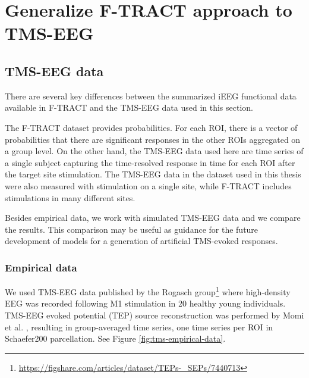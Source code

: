 \chapter{Generalize F-TRACT approach to TMS-EEG}\label{ch:pytepfit}

\section{TMS-EEG data}\label{sec:reponse_definition}

There are several key differences between the summarized iEEG functional data available in F-TRACT and the TMS-EEG data used in this section. 

The F-TRACT dataset provides probabilities. For each ROI, there is a vector of probabilities that there are significant responses in the other ROIs aggregated on a group level. On the other hand, the TMS-EEG data used here are time series of a single subject capturing the time-resolved response in time for each ROI after the target site stimulation. The TMS-EEG data in the dataset used in this thesis were also measured with stimulation on a single site, while F-TRACT includes stimulations in many different sites.

Besides empirical data, we work with simulated TMS-EEG data and we compare the results. This comparison may be useful as guidance for the future development of models for a generation of artificial TMS-evoked responses.

\subsection{Empirical data}

We used TMS-EEG data published by the Rogasch group\footnote{\url{https://figshare.com/articles/dataset/TEPs-_SEPs/7440713}} \cite{biabani_characterizing_2019} where high-density EEG was recorded following M1 stimulation in 20 healthy young individuals. TMS-EEG evoked potential (TEP) source reconstruction was performed by Momi et al. \cite{momi_tms-evoked_2023}, resulting in group-averaged time series, one time series per ROI in Schaefer200 parcellation. See Figure \ref{fig:tms-empirical-data}. 


